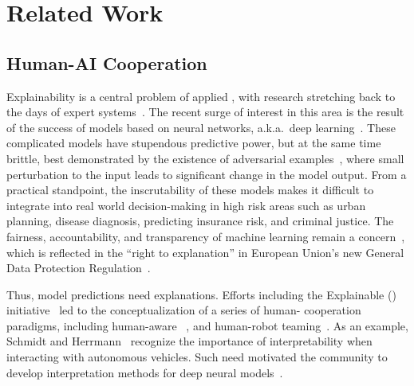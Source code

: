\section{Related Work}
\label{sec:related}

\subsection{Human-AI Cooperation}
Explainability is a central problem of applied , with research
stretching back to the days of expert
systems~\cite{swartout1983xplain}.
The recent surge of interest in this area is the
result of the success of  models based on neural networks,
a.k.a.\ deep learning~\cite{lecun2015deep}. These complicated models
have stupendous predictive power, but at the same time brittle, best
demonstrated by the existence of adversarial
examples~\cite{goodfellow2014explaining}, where small perturbation to
the input leads to significant change in the model output.
From a practical standpoint, the inscrutability of these models makes
it difficult to integrate into real world decision-making in high risk
areas such as urban planning, disease diagnosis, predicting insurance
risk, and criminal justice.
The fairness, accountability, and transparency of machine learning
remain a concern~\cite{acm2017public}, which is reflected in the
``right to explanation'' in European Union's new General Data
Protection Regulation~\cite[]{gdpr}. 

Thus,  model predictions need explanations.
Efforts including the Explainable  ()
initiative~\cite{gunning2017explainable} led to the conceptualization
of a series of human- cooperation paradigms, including
human-aware ~\cite{chakraborti2017ai}, and human-robot
teaming~\cite{vinson2018human}. 
As an example, Schmidt and Herrmann~\cite{schmidt2017intervention}
recognize the importance of interpretability when interacting with
autonomous vehicles.
Such need motivated the  community to develop interpretation
methods for deep neural models~\cite[\em inter
alia]{baehrens2010explain, simonyan2013deep}.


